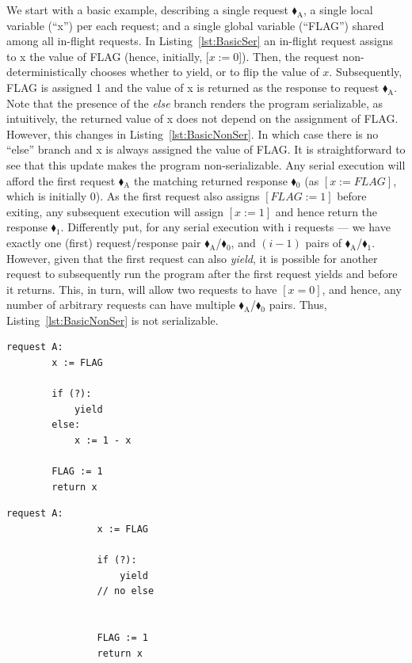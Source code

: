 We start with a basic example, describing a single request {\color{ForestGreen}$\blacklozenge_\text{A}$}, a single local variable (``x'') per each request; and a single global variable (``FLAG'') shared among all in-flight requests. 
%
In Listing~\ref{lst:BasicSer} an in-flight request assigns to x the value of FLAG (hence, initially, [$x:=0$]). Then, the request non-deterministically chooses whether to yield, or to flip the value of $x$. Subsequently, FLAG is assigned 1 and the value of x is returned as the response to request {\color{ForestGreen}$\blacklozenge_\text{A}$}. 
%
Note that the presence of the \textit{else} branch renders the program serializable, as intuitively, the returned value of x does not depend on the assignment of FLAG.
%
However, this changes in  Listing~\ref{lst:BasicNonSer}. In which case there is no ``else'' branch and x is always assigned the value of FLAG.
%
It is straightforward to see that this update makes the program non-serializable. Any serial execution will afford the first request {\color{ForestGreen}$\blacklozenge_\text{A}$} the matching returned response {\color{red}$\blacklozenge_0$} (as $[x:=FLAG]$, which is initially 0). As the first request also assigns $[FLAG:=1]$ before exiting, any subsequent execution will assign $[x:=1]$ and hence return the response {\color{red}$\blacklozenge_1$}. Differently put, for any serial execution with i requests --- we have exactly one (first) request/response pair {\color{ForestGreen}$\blacklozenge_\text{A}$}/{\color{red}$\blacklozenge_0$}, and $(i-1)$ pairs of {\color{ForestGreen}$\blacklozenge_\text{A}$}/{\color{red}$\blacklozenge_1$}.
%
However, given that the first request can also \textit{yield}, it is possible for another request to subsequently run the program after the first request yields and before it returns. This, in turn, will allow two requests to have $[x=0]$, and hence, any number of arbitrary requests can have multiple {\color{ForestGreen}$\blacklozenge_\text{A}$}/{\color{red}$\blacklozenge_0$} pairs. Thus, Listing~\ref{lst:BasicNonSer} is not serializable.





\noindent
\begin{minipage}[t]{0.45\textwidth}
	\begin{lstlisting}[caption={Serializable},
		label={lst:BasicSer}]
	request A: 
		x := FLAG
		
		if (?):
			yield
		else:
			x := 1 - x
		
		FLAG := 1
		return x
	\end{lstlisting}
\end{minipage}
\hfill
\begin{minipage}[t]{0.45\textwidth}
	\begin{lstlisting}[caption={Not serializable},
	label={lst:BasicNonSer}]
			request A: 
			    x := FLAG 
			
			    if (?): 
			        yield
			    // no else
			
			
			    FLAG := 1 
			    return x
		\end{lstlisting}
\end{minipage}%

